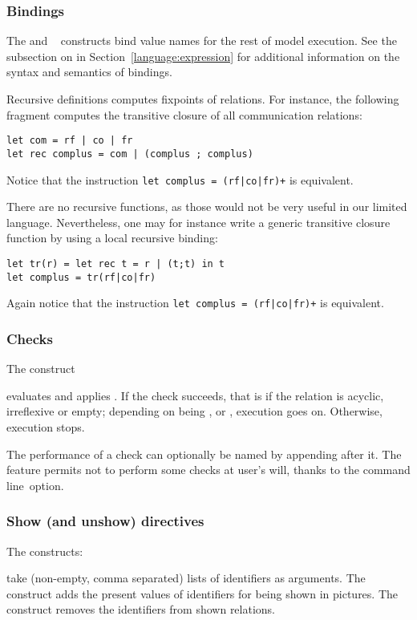 \subsubsection*{Bindings}
The  and ~ constructs bind value names for the rest
of model execution.
See the subsection on 
in Section~\ref{language:expression}
for additional information on the syntax and semantics of bindings.


Recursive definitions computes fixpoints of relations.
For instance, the following fragment computes the transitive closure of
all communication relations:
\begin{verbatim}
let com = rf | co | fr
let rec complus = com | (complus ; complus)
\end{verbatim}
Notice that the instruction \verb-let complus = (rf|co|fr)+- is equivalent.


There are no recursive functions, as those would not be very useful in
our limited language. Nevertheless, one may for instance
write a generic transitive closure
function by using a local recursive binding:
\begin{verbatim}
let tr(r) = let rec t = r | (t;t) in t
let complus = tr(rf|co|fr)
\end{verbatim}
Again notice that the instruction
\verb-let complus = (rf|co|fr)+- is equivalent.

\subsubsection*{Checks}
The construct
\begin{center}\end{center}
evaluates  and applies .
If the check succeeds, that is if the relation is acyclic, irreflexive
or empty; depending on  being , 
or , execution goes on. Otherwise, execution stops.

\label{name:check:def}The performance of a
check can optionally be named  by appending
 after it.
The feature permits not to perform some checks at user's will,
thanks to the 
command line~option.


\subsubsection*{Show (and unshow) directives}
\label{show:def}The constructs:
\begin{center}
\quad{}
\end{center}
take (non-empty, comma separated) lists of identifiers as arguments.
The  construct adds the present values of identifiers for being
shown in pictures.
The  construct removes the identifiers from shown relations.

